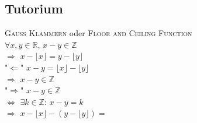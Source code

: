 \newpage

\subsection{Tutorium}

\textsc{Gauss Klammern} oder \textsc{Floor and Ceiling Function}\\

$\forall x,y\in\mathbb{R}$, $x-y\in\mathbb{Z}$\\

$\Rightarrow$ $x-\lfloor x\rfloor=y-\lfloor y\rfloor$\\

"$\Leftarrow$" $x-y=\lfloor x\rfloor-\lfloor y\rfloor$\\

$\Rightarrow$ $x-y\in\mathbb{Z}$\\

"$\Rightarrow$" $x-y\in\mathbb{Z}$\\

$\Leftrightarrow$ $\exists k\in\mathbb{Z}$: $x-y=k$\\

$\Rightarrow$ $x-\lfloor x\rfloor-(y-\lfloor y\rfloor)=$\\
